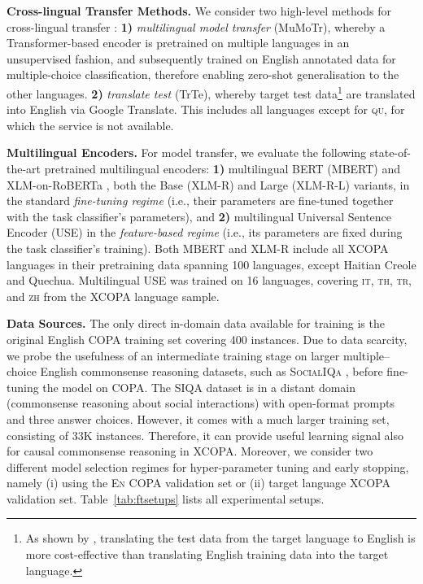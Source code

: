 \documentclass[11pt,a4paper]{article}
\begin{document}
\vspace{1.4mm}
\noindent \textbf{Cross-lingual Transfer Methods.}
We consider two high-level methods for cross-lingual transfer \citep{tiedemann-2015-cross,Ponti:2019cl}: \textbf{1)} \textit{multilingual model transfer} (MuMoTr), whereby a Transformer-based encoder is pretrained on multiple languages in an unsupervised fashion, and subsequently trained on English annotated data for multiple-choice classification, therefore enabling zero-shot generalisation to the other languages. \textbf{2)} \textit{translate test} (TrTe), whereby target test data\footnote{As shown by \citet{Conneau:2018emnlp}, translating the test data from the target language to English is more cost-effective than translating English training data into the target language.} are translated into English via Google Translate. This includes all languages except for \textsc{qu}, for which the service is not available.




\vspace{1.4mm}
\noindent \textbf{Multilingual Encoders.}
For model transfer, we evaluate the following state-of-the-art pretrained multilingual encoders: \textbf{1)} multilingual BERT (MBERT) \cite{Devlin:2019bert} and XLM-on-RoBERTa \cite{conneau2019unsupervised}, both the Base (XLM-R) and Large (XLM-R-L) variants, in the standard \textit{fine-tuning regime} (i.e., their parameters are fine-tuned together with the task classifier's parameters), and \textbf{2)} multilingual Universal Sentence Encoder (USE) \cite{yang2019multilingual} in the \textit{feature-based regime} (i.e., its parameters are fixed during the task classifier's training). Both MBERT and XLM-R include all XCOPA languages in their pretraining data spanning 100 languages, except Haitian Creole and Quechua. Multilingual USE was trained on 16 languages, covering \textsc{it}, \textsc{th}, \textsc{tr}, and \textsc{zh} from the XCOPA language sample.

\vspace{1.4mm}
\noindent \textbf{Data Sources.} The only direct in-domain data available for training is the original English COPA training set covering 400 instances. 
Due to data scarcity, we probe the usefulness of an intermediate training stage \citep{phang2018sentence,glavavs2020supervised} on larger multiple--choice English commonsense reasoning datasets, such as \textsc{SocialIQa} \cite[SIQA;][]{Sap:2019siqa}, before fine-tuning the model on COPA. The SIQA dataset is in a distant domain (commonsense reasoning about social interactions) with open-format prompts and three answer choices. However, it comes with a much larger training set, consisting of 33K instances. Therefore, it can provide useful learning signal also for causal commonsense reasoning in XCOPA. Moreover, we consider two different model selection regimes for hyper-parameter tuning and early stopping, namely (i) using the \textsc{En} COPA validation set or (ii) target language XCOPA validation set. Table~\ref{tab:ftsetups} lists all experimental setups.
\end{document}
